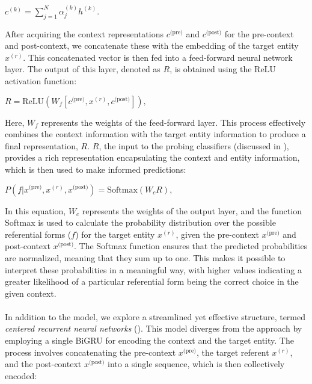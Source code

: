 \ea$
	c^{(k)} = \sum_{j=1}^N \alpha_j^{(k)} h^{(k)}.
$\z


After acquiring the context representations $c^{\text{(pre)}}$ and $c^{\text{(post)}}$ for the pre-context and post-context, we concatenate these with the embedding of the target entity $x^{(r)}$. This concatenated vector is then fed into a feed-forward neural network layer. The output of this layer, denoted as $R$, is obtained using the ReLU activation function:

\ea$
	R = \mbox{ReLU}(W_f [c^{\text{(pre)}}, x^{(r)}, c^{\text{(post)}}]),
$\z

Here, $W_f$ represents the weights of the feed-forward layer. This process effectively combines the context information with the target entity information to produce a final representation, $R$. $R$, the input to the probing classifiers (discussed in ), provides a rich representation encapsulating the context and entity information, which is then used to make informed predictions:


\ea$
	P(f|x^{\text{(pre)}}, x^{(r)}, x^{\text{(post)}}) = \mbox{Softmax}(W_c R),
$\z


In this equation, $W_c$ represents the weights of the output layer, and the function \mbox{Softmax} is used to calculate the probability distribution over the possible referential forms ($f$) for the target entity $x^{(r)}$, given the pre-context $x^{\text{(pre)}}$ and post-context $x^{\text{(post)}}$. The Softmax function ensures that the predicted probabilities are normalized, meaning that they sum up to one. This makes it possible to interpret these probabilities in a meaningful way, with higher values indicating a greater likelihood of a particular referential form being the correct choice in the given context.

\paragraph*{} 

In addition to the  model, we explore a streamlined yet effective structure, termed \textit{centered recurrent neural networks} (). This model diverges from the  approach by employing a single BiGRU for encoding the context and the target entity. The process involves concatenating the pre-context $x^{\text{(pre)}}$, the target referent $x^{(r)}$, and the post-context $x^{\text{(post)}}$ into a single sequence, which is then collectively encoded:

